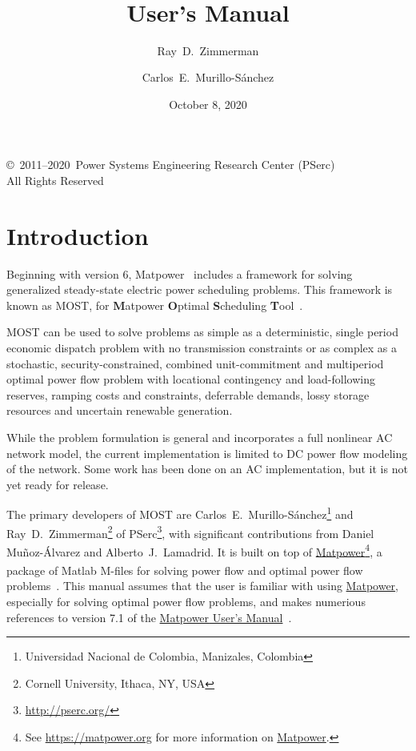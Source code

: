 \documentclass[12pt]{article}
\title{\mostname{}\\\most{} \mostver{}\\
User's Manual}
\author{Ray~D.~Zimmerman \and Carlos~E.~Murillo-S\'anchez}
\date{October 8, 2020} %
\newcommand{\mpver}[0]{7.1}
\newcommand{\matlab}[0]{{\sc Matlab}}
\newcommand{\matpower}[0]{{\sc Matpower}}
\newcommand{\matpowerurl}[0]{https://matpower.org}
\newcommand{\matpowerlink}[0]{\href{\matpowerurl}{\matpower{}}}
\newcommand{\most}[0]{{MOST}}
\newcommand{\mostname}[0]{{{\bf M}{\sc atpower} \textbf{O}ptimal \textbf{S}cheduling \textbf{T}ool}}
\newcommand{\pserc}[0]{{\sc PSerc}}
\newcommand{\PSERC}[0]{{Power Systems Engineering Research Center (\pserc{})}}
\newcommand{\mumurl}[0]{https://matpower.org/docs/MATPOWER-manual-\mpver.pdf}
\newcommand{\mum}[0]{\href{\mumurl}{\matpower{} User's Manual}}
\numberwithin{equation}{section}
\numberwithin{table}{section}
\numberwithin{figure}{section}
\begin{document}
\maketitle
\thispagestyle{empty}
\vfill
\begin{center}
{\scriptsize
\copyright~2011--2020~\PSERC{}\\
All Rights Reserved}
\end{center}

\clearpage
\tableofcontents
\clearpage
\listoffigures
\listoftables

\clearpage
\section{Introduction}

Beginning with version 6, \matpower{}~\cite{zimmerman2011,matpower,matpower_manual} includes a framework for solving generalized steady-state electric power scheduling problems. This framework is known as \most{}, for \mostname{}~\cite{murillo-sanchez2013a,lamadrid2018}.

\most{} can be used to solve problems as simple as a deterministic, single period economic dispatch problem with no transmission constraints or as complex as a stochastic, security-constrained, combined unit-commitment and multiperiod optimal power flow problem with locational contingency and load-following reserves, ramping costs and constraints, deferrable demands, lossy storage resources and uncertain renewable generation.

While the problem formulation is general and incorporates a full nonlinear AC network model, the current implementation is limited to DC power flow modeling of the network. Some work has been done on an AC implementation, but it is not yet ready for release.

The primary developers of \most{} are Carlos~E.~Murillo-S\'anchez\footnote{Universidad Nacional de Colombia, Manizales, Colombia} and Ray~D.~Zimmerman\footnote{Cornell University, Ithaca, NY, USA} of \pserc{}\footnote{\url{http://pserc.org/}}, with significant contributions from Daniel Mu\~noz-\'Alvarez and Alberto~J.~Lamadrid. It is built on top of \matpowerlink{}\footnote{See \url{\matpowerurl} for more information on \matpowerlink{}.}, a package of \matlab{}\textsuperscript{\tiny \textregistered} M-files for solving power flow and optimal power flow problems~\cite{zimmerman2011, zimmerman2009}. This manual assumes that the user is familiar with using \matpowerlink{}, especially for solving optimal power flow problems, and makes numerious references to version \mpver{} of the \mum{}~\cite{matpower_manual}.
\end{document}
